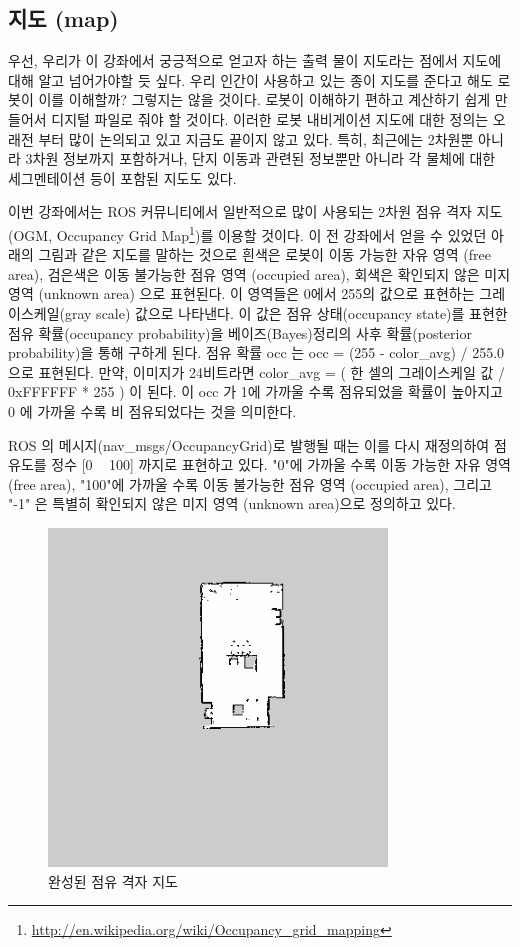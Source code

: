 \subsection{지도 (map)}

우선, 우리가 이 강좌에서 궁긍적으로 얻고자 하는 출력 물이 지도라는 점에서 지도에 대해 알고 넘어가야할 듯 싶다. 우리 인간이 사용하고 있는 종이 지도를 준다고 해도 로봇이 이를 이해할까? 그렇지는 않을 것이다. 로봇이 이해하기 편하고 계산하기 쉽게 만들어서 디지털 파일로 줘야 할 것이다. 이러한 로봇 내비게이션 지도에 대한 정의는 오래전 부터 많이 논의되고 있고 지금도 끝이지 않고 있다. 특히, 최근에는 2차원뿐 아니라 3차원 정보까지 포함하거나, 단지 이동과 관련된 정보뿐만 아니라 각 물체에 대한 세그멘테이션 등이 포함된 지도도 있다.

이번 강좌에서는 ROS 커뮤니티에서 일반적으로 많이 사용되는 2차원 점유 격자 지도(OGM, Occupancy Grid Map\footnote{\url{http://en.wikipedia.org/wiki/Occupancy_grid_mapping}})를 이용할 것이다. 이 전 강좌에서 얻을 수 있었던 아래의 그림과 같은 지도를 말하는 것으로 흰색은 로봇이 이동 가능한 자유 영역 (free area), 검은색은 이동 불가능한 점유 영역 (occupied area), 회색은 확인되지 않은 미지 영역 (unknown area) 으로 표현된다. 이 영역들은 0에서 255의 값으로 표현하는 그레이스케일(gray scale) 값으로 나타낸다. 이 값은 점유 상태(occupancy state)를 표현한 점유 확률(occupancy probability)을 베이즈(Bayes)정리의 사후 확률(posterior probability)을 통해 구하게 된다. 점유 확률 occ 는 occ = (255 - color\_avg) / 255.0 으로 표현된다. 만약, 이미지가 24비트라면 color\_avg = ( 한 셀의 그레이스케일 값 / 0xFFFFFF * 255 ) 이 된다. 이 occ 가 1에 가까울 수록 점유되었을 확률이 높아지고 0 에 가까울 수록 비 점유되었다는 것을 의미한다.

ROS 의 메시지(nav\_msgs/OccupancyGrid)로 발행될 때는 이를 다시 재정의하여 점유도를 정수 [0 ~ 100] 까지로 표현하고 있다. "0"에 가까울 수록 이동 가능한 자유 영역 (free area), "100"에 가까울 수록 이동 불가능한 점유 영역 (occupied area), 그리고 "-1" 은 특별히 확인되지 않은 미지 영역 (unknown area)으로 정의하고 있다.

\begin{figure}[h]
\centering
\includegraphics[width=0.5\columnwidth]{pictures/chapter11/slam_map.png}
\caption{완성된 점유 격자 지도}
\end{figure}


